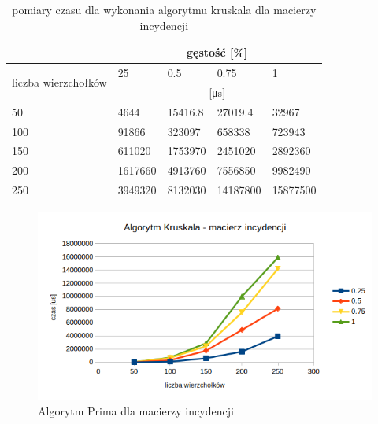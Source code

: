 \documentclass[11pt]{article}
\begin{document}
\begin{table}[H]
    \centering
    \begin{tabular}{|l|llll|}
        \hline
                                             & \multicolumn{4}{c|}{gęstość {[}\%{]}}                                                                           \\ \hline
        \multirow{2}{*}{liczba wierzchołków} & \multicolumn{1}{l|}{25}               & \multicolumn{1}{l|}{0.5}     & \multicolumn{1}{l|}{0.75}     & 1        \\ \cline{2-5}
                                             & \multicolumn{4}{c|}{[μs]}                                                                                       \\ \hline
        50                                   & \multicolumn{1}{l|}{4644}             & \multicolumn{1}{l|}{15416.8} & \multicolumn{1}{l|}{27019.4}  & 32967    \\ \hline
        100                                  & \multicolumn{1}{l|}{91866}            & \multicolumn{1}{l|}{323097}  & \multicolumn{1}{l|}{658338}   & 723943   \\ \hline
        150                                  & \multicolumn{1}{l|}{611020}           & \multicolumn{1}{l|}{1753970} & \multicolumn{1}{l|}{2451020}  & 2892360  \\ \hline
        200                                  & \multicolumn{1}{l|}{1617660}          & \multicolumn{1}{l|}{4913760} & \multicolumn{1}{l|}{7556850}  & 9982490  \\ \hline
        250                                  & \multicolumn{1}{l|}{3949320}          & \multicolumn{1}{l|}{8132030} & \multicolumn{1}{l|}{14187800} & 15877500 \\ \hline
    \end{tabular}
    \caption{pomiary czasu dla wykonania algorytmu kruskala dla macierzy incydencji}
    \label{tab:my-table}
\end{table}
\begin{figure}[H]
    \includegraphics[width=13cm]{images/kruskalmacierz.png}
    \caption{ Algorytm Prima dla    macierzy incydencji}
\end{figure}
\end{document}
